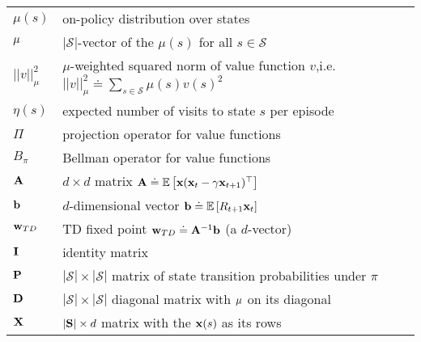 \documentclass[10pt, landscape, a4paper]{article}
\begin{document}
\begin{multicols}{3}
        \begin{tabular}{ p{} p{} }
            $\mu(s)$      & on-policy distribution over states                                                                              \\
            $\vb{\mu}$    & $|\mathcal{S}|$-vector of the $\mu(s)$ for all $s\in\mathcal{S}$                                                \\
            $||v||_\mu^2$ & $\mu$-weighted squared norm of value function $v$,i.e. $||v||_\mu^2\doteq \sum_{s\in\mathcal{S}} \mu(s) v(s)^2$ \\
            $\eta(s)$     & expected number of visits to state $s$ per episode                                                              \\
            $\Pi$         & projection operator for value functions                                                                         \\
            $B_\pi$       & Bellman operator for value functions                                                                            \\
            $\vb{A}$      & $d\times d$ matrix $\vb{A}\doteq\mathbb{E} \left[\vb{x}(\vb{x}_t- \gamma\vb{x}_{t+1})^\top\right]$              \\
            $\vb{b}$      & $d$-dimensional vector $\vb{b}\doteq\mathbb{E}\left[R_{t+1}\vb{x}_t\right]$                                     \\
            $\vb{w}_{TD}$ & TD fixed point $\vb{w}_{TD}\doteq\vb{A}^{-1}\vb{b}$ (a $d$-vector)                                              \\
            $\vb{I}$      & identity matrix                                                                                                 \\
            $\vb{P}$      & $|\mathcal{S}| \times |\mathcal{S}|$ matrix of state transition probabilities under $\pi$                       \\
            $\vb{D}$      & $|\mathcal{S}| \times |\mathcal{S}|$ diagonal matrix with $\vb{\mu}$ on its diagonal                            \\
            $\vb{X}$      & $|\vb{S}|\times d$ matrix with the $\vb{x}(s)$ as its rows                                                      \\
        \end{tabular}


\end{multicols}
\end{document}
